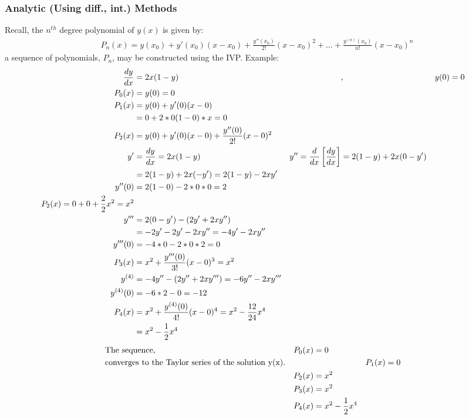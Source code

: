 		\subsubsection{Analytic (Using diff., int.) Methods}
			Recall, the $n^{th}$ degree polynomial of $y(x)$ is given by:
			\begin{align}
				P_{n}(x) = y(x_{0}) + y'(x_{0})(x-x_{0}) + \frac{y''(x_{0})}{2!}(x-x_{0})^{2} + \dots + \frac{y^{(n)}(x_{0})}{n!}(x-x_{0})^{n}
			\end{align}
			a sequence of polynomials, ${P_{n}}$, may be constructed using the IVP.
			Example:
			\begin{align}
				\frac{dy}{dx} &= 2x(1-y)& &,& &y(0) = 0& \\
				P_{0}(x) &= y(0) = 0& \\
				P_{1}(x) &= y(0) + y'(0)(x-0)& \notag \\
				&= 0 + 2*0(1-0)*x = 0& \\
				P_{2}(x) &= y(0) + y'(0)(x-0) + \frac{y''(0)}{2!}(x-0)^{2}& \notag \\
				y' &= \frac{dy}{dx} = 2x(1-y)&
				y'' = \frac{d}{dx}\left[ \frac{dy}{dx} \right] &= 2(1-y)+2x(0-y')& \notag \\
				&= 2(1-y) + 2x(-y') = 2(1-y) - 2xy'& \\
				y''(0) &= 2(1-0) - 2*0*0 = 2& \\
				P_{2}(x) = 0 + 0 + \frac{2}{2}x^{2} = x^{2}\\
				y''' &= 2(0-y')-(2y' + 2xy'')& \notag \\
				&= -2y' - 2y' - 2xy'' = -4y' - 2xy''& \\
				y'''(0) &= -4*0 - 2*0*2 = 0& \\
				P_{3}(x) &= x^{2} + \frac{y'''(0)}{3!}(x-0)^{3} = x^{2}& \\
				y^{(4)} &= -4y''-(2y''+2xy''') = -6y'' - 2xy'''& \\
				y^{(4)}(0) &= -6*2 - 0 = -12& \\
				P_{4}(x) &= x^{2} + \frac{y^{(4)}(0)}{4!}(x-0)^{4} = x^{2} - \frac{12}{24}x^{4}& \notag \\
				&= x^{2} - \frac{1}{2}x^{4}&
			\end{align}
			\begin{align}
				&\text{The sequence, }& &P_{0}(x) = 0& \notag \\ &\text{converges to the Taylor series of the solution y(x).}
				&& &P_{1}(x) = 0& \notag \\
				&& &P_{2}(x) = x^{2}& \notag \\
				&& &P_{3}(x) = x^{2}& \notag \\
				&& &P_{4}(x) = x^{2} - \frac{1}{2}x^{4}& \notag \\
			\end{align}

